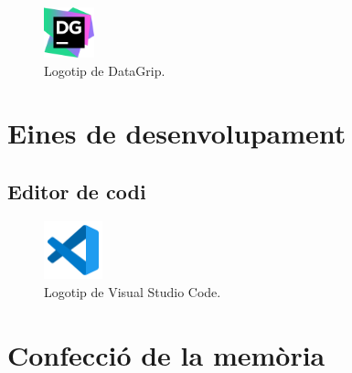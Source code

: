 \documentclass[a4paper,12pt]{ThesisStyle}
\begin{document}
\begin{figure}[H]
  \centering
  \includegraphics[width=0.13\textwidth]{assets/logos/DataGrip.png}
  \caption{\label{img:logo_datagrip}Logotip de DataGrip.}
\end{figure}

\section{Eines de desenvolupament}
\label{sec:decisions_desenvolupament}




\subsection{Editor de codi}
\label{subsec:decisions_desenvolupament_editor}



\begin{figure}[H]
  \centering
  \includegraphics[width=0.15\textwidth]{assets/logos/VSCode.png}
  \caption{\label{img:logo_vscode}Logotip de Visual Studio Code.}
\end{figure}

\section{Confecció de la memòria}
\label{sec:decisions_memoria}

\end{document}
